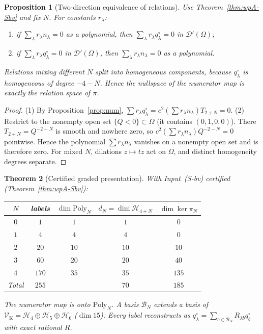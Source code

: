\documentclass{article}
\newtheorem{proposition}{Proposition}
\newtheorem{theorem}[proposition]{Theorem}
\theoremstyle{remark}
\begin{document}
\begin{proposition}[Two-direction equivalence of relations]
\label{prop:relations}
Use Theorem~\ref{thm:wpA-Sbv} and fix $N$.
For constants $r_\lambda$:
\begin{enumerate}
\item if $\sum_\lambda r_\lambda n_\lambda=0$ as a polynomial, then $\sum_\lambda r_\lambda q^\circ_\lambda=0$ in $\mathcal D'(\Omega)$;
\item if $\sum_\lambda r_\lambda q^\circ_\lambda=0$ in $\mathcal D'(\Omega)$, then $\sum_\lambda r_\lambda n_\lambda=0$ as a polynomial.
\end{enumerate}
Relations mixing different $N$ split into homogeneous components, because $q^\circ_\lambda$ is homogeneous of degree $-4-N$.
Hence the nullspace of the numerator map is exactly the relation space of $\pi$.
\end{proposition}

\begin{proof}
(1) By Proposition~\ref{prop:num}, $\sum r_\lambda q^\circ_\lambda=c^2(\sum r_\lambda n_\lambda)T_{2+N}=0$.
(2) Restrict to the nonempty open set $\{Q<0\}\subset\Omega$ (it contains $(0,1,0,0)$).
There $T_{2+N}=Q^{-2-N}$ is smooth and nowhere zero, so $c^2(\sum r_\lambda n_\lambda)Q^{-2-N}=0$ pointwise.
Hence the polynomial $\sum r_\lambda n_\lambda$ vanishes on a nonempty open set and is therefore zero.
For mixed $N$, dilations $z\mapsto tz$ act on $\Omega$, and distinct homogeneity degrees separate.
\end{proof}

\begin{theorem}[Certified graded presentation]
\label{thm:M2}
With Input~(S-bv) certified (Theorem~\ref{thm:wpA-Sbv}):
\begin{center}
\begin{tabular}{ccccc}
\hline
$N$ & labels & $\dim\mathrm{Poly}_N$ & $d_N=\dim\mathcal H_{4+N}$ & $\dim\ker\pi_N$\\
\hline
$0$ & $1$ & $1$ & $1$ & $0$\\
$1$ & $4$ & $4$ & $4$ & $0$\\
$2$ & $20$ & $10$ & $10$ & $10$\\
$3$ & $60$ & $20$ & $20$ & $40$\\
$4$ & $170$ & $35$ & $35$ & $135$\\
\hline
Total & $255$ & & $70$ & $185$\\
\hline
\end{tabular}
\end{center}
The numerator map is onto $\mathrm{Poly}_N$.
A basis $\mathcal B_N$ extends a basis of $\mathcal V_{\mathrm K}=\mathcal H_4\oplus\mathcal H_5\oplus\mathcal H_6$ ($\dim15$).
Every label reconstructs as $q^\circ_\lambda=\sum_{b\in\mathcal B_N}R_{\lambda b}q^\circ_b$ with exact rational $R$.
\end{theorem}
\end{document}
